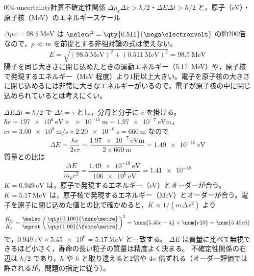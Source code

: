 \documentclass[uplatex,dvipdfmx,a4paper,11pt]{jsarticle}
\begin{document}
\begin{mondai}{004-uncertainty}{計算}{不確定性関係 $\Delta p_x\Delta x>\hbar/2$・$\Delta E\Delta t>\hbar/2$ と，原子（\unit{\electronvolt}）・原子核（\unit{\mega\electronvolt}）のエネルギースケール}
\begin{tadashii}
 $\Delta p\,c=\qty{98.5}{\mega\electronvolt}$ は $\melec c^2=\qty{0.511}{\mega\electronvolt}$ の約200倍なので，$p\ll m$ を前提とする非相対論の式は使えない。
\[ E=\sqrt{(\qty{98.5}{\mega\electronvolt})^2+(\qty{0.511}{\mega\electronvolt})^2}=\qty{98.5}{\mega\electronvolt} \]
陽子を同じ大きさに閉じ込めたときの運動エネルギー（\qty{5.17}{\mega\electronvolt}）や，原子核で発現するエネルギー（\unit{\mega\electronvolt} 程度）より1桁以上大きい。電子を原子核の大きさに閉じ込めるには非常に大きなエネルギーがいるので，電子が原子核の中に閉じ込められているとは考えにくい。 %

 $\Delta E\Delta t=\hbar/2$ で $\Delta t=\tau$ とし，分母と分子に $c$ を掛ける。$\hbar c=\qty{197e6}{\electronvolt}\times\qty{e-15}{\metre}=\qty{1.97e-7}{\electronvolt\metre}$，$c\tau=\qty{3.00e8}{\metre\per\second}\times\qty{2.20e-6}{\second}=\qty{660}{\metre}$ なので
\[ \Delta E=\frac{\hbar c}{2c\tau}=\frac{\qty{1.97e-7}{\electronvolt\metre}}{2\times\qty{660}{\metre}}=\qty{1.49e-10}{\electronvolt} \]
質量との比は
\[ \frac{\Delta E}{m_\mu c^2}=\frac{\qty{1.49e-10}{\electronvolt}}{\qty{106e6}{\electronvolt}}=\num{1.41e-18} \]
\kenzan {} $K=\qty{0.949}{\electronvolt}$ は，原子で発現するエネルギー（\unit{\electronvolt}）とオーダーが合う。 %
 $K=\qty{5.17}{\mega\electronvolt}$ は，原子核で発現するエネルギー（\unit{\mega\electronvolt}）とオーダーが合う。電子を原子に閉じ込めた値との比で確かめると，$K\propto1/(m\Delta x^2)$ より %
\[ \frac{K_{\mathrm{p}}}{K_{\mathrm{e}}}=\frac{\melec}{\mprot}\left(\frac{\qty{0.100}{\nano\metre}}{\qty{1.00}{\femto\metre}}\right)^2=\num{5.45e-4}\times\num{e10}=\num{5.45e6} \]
で，$\qty{0.949}{\electronvolt}\times\num{5.45e6}=\qty{5.17}{\mega\electronvolt}$ と一致する。 $\Delta E$ は質量に比べて無視できるほど小さく，寿命の長い粒子の質量は精度よく決まる。
\tsumazuki 不確定性関係の右辺は $\hbar/2$ であり，$\hbar$ や $h$ と取り違えると2倍や $4\pi$ 倍ずれる（オーダー評価では許されるが，問題の指定に従う）。
\end{tadashii}
\end{mondai}
\end{document}
